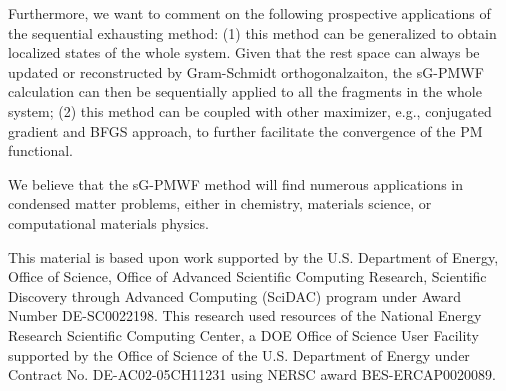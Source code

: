 \documentclass[journal=jacsat,manuscript=article]{achemso}
\begin{document}
Furthermore, we want to comment on the following prospective applications of the sequential exhausting method:
(1) this method can be generalized to obtain localized states of the whole system. Given that the rest space can always be updated or reconstructed by Gram-Schmidt orthogonalzaiton, the sG-PMWF calculation can then be sequentially applied to all the fragments in the whole system;
(2) this method can be coupled with other maximizer, e.g., conjugated gradient and BFGS approach, to further facilitate the convergence of the PM functional.

We believe that the sG-PMWF method will find numerous applications in condensed matter problems, either in chemistry, materials science, or computational materials physics.

\begin{acknowledgement}
This material is based upon work supported by the U.S. Department of Energy, Office of Science, Office of Advanced Scientific Computing Research, Scientific Discovery through Advanced Computing (SciDAC) program under Award Number DE-SC0022198. This research used resources of the National Energy Research
Scientific Computing Center, a DOE Office of Science User Facility
supported by the Office of Science of the U.S. Department of Energy
under Contract No. DE-AC02-05CH11231 using NERSC award
BES-ERCAP0020089.
\end{acknowledgement}
\end{document}

